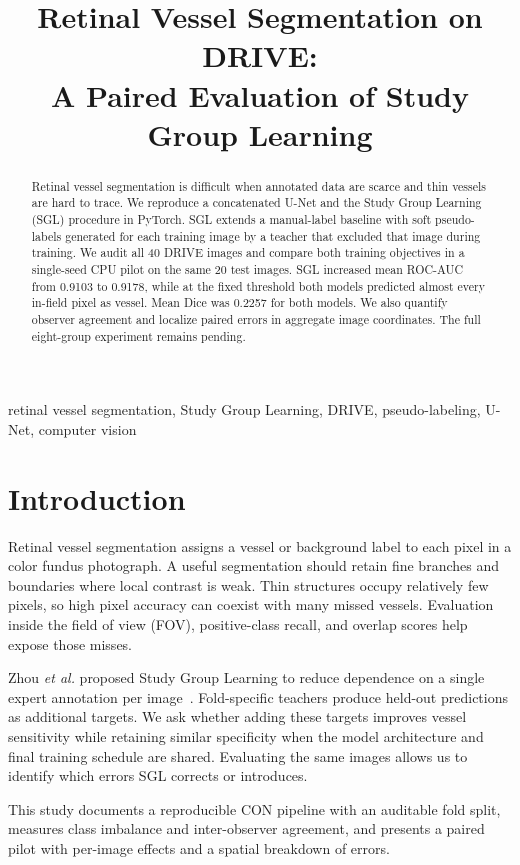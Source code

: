 \documentclass[a4paper,conference]{IEEEtran}
\title{Retinal Vessel Segmentation on DRIVE:\\
A Paired Evaluation of Study Group Learning}
\author{\IEEEauthorblockN{Prerak Arya}
\IEEEauthorblockA{230039}
\and
\IEEEauthorblockN{Abhsihek Meena}
\IEEEauthorblockA{230137}}
\begin{document}
\maketitle
\begin{abstract}
Retinal vessel segmentation is difficult when annotated data are scarce and thin vessels are hard to trace. We reproduce a concatenated U-Net and the Study Group Learning (SGL) procedure in PyTorch. SGL extends a manual-label baseline with soft pseudo-labels generated for each training image by a teacher that excluded that image during training. We audit all 40 DRIVE images and compare both training objectives in a single-seed CPU pilot on the same 20 test images. SGL increased mean ROC-AUC from 0.9103 to 0.9178, while at the fixed threshold both models predicted almost every in-field pixel as vessel. Mean Dice was 0.2257 for both models. We also quantify observer agreement and localize paired errors in aggregate image coordinates. The full eight-group experiment remains pending.
\end{abstract}
\begin{IEEEkeywords}
retinal vessel segmentation, Study Group Learning, DRIVE, pseudo-labeling, U-Net, computer vision
\end{IEEEkeywords}

\section{Introduction}
Retinal vessel segmentation assigns a vessel or background label to each pixel in a color fundus photograph. A useful segmentation should retain fine branches and boundaries where local contrast is weak. Thin structures occupy relatively few pixels, so high pixel accuracy can coexist with many missed vessels. Evaluation inside the field of view (FOV), positive-class recall, and overlap scores help expose those misses.

Zhou \textit{et al.} proposed Study Group Learning to reduce dependence on a single expert annotation per image~\cite{zhou}. Fold-specific teachers produce held-out predictions as additional targets. We ask whether adding these targets improves vessel sensitivity while retaining similar specificity when the model architecture and final training schedule are shared. Evaluating the same images allows us to identify which errors SGL corrects or introduces.

This study documents a reproducible CON pipeline with an auditable fold split, measures class imbalance and inter-observer agreement, and presents a paired pilot with per-image effects and a spatial breakdown of errors.
\end{document}
